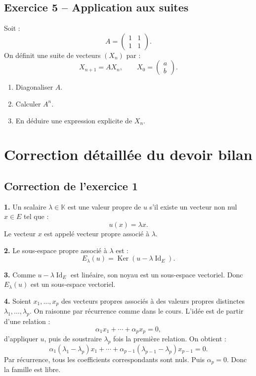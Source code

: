 \documentclass[11pt,a4paper]{article}
\newcommand{\K}{\mathbb K}
\newcommand{\Ker}{\operatorname{Ker}}
\newcommand{\Id}{\operatorname{Id}}
\begin{document}
\subsection*{Exercice 5 -- Application aux suites}

Soit :
\[
A=
\begin{pmatrix}
1&1\\
1&1
\end{pmatrix}.
\]
On définit une suite de vecteurs \((X_n)\) par :
\[
X_{n+1}=AX_n,
\qquad
X_0=
\begin{pmatrix}
a\\b
\end{pmatrix}.
\]

\begin{enumerate}
    \item Diagonaliser \(A\).
    \item Calculer \(A^n\).
    \item En déduire une expression explicite de \(X_n\).
\end{enumerate}

\newpage

\section{Correction détaillée du devoir bilan}

\subsection*{Correction de l'exercice 1}

\textbf{1.}  
Un scalaire \(\lambda\in\K\) est une valeur propre de \(u\) s'il existe un vecteur non nul \(x\in E\) tel que :
\[
u(x)=\lambda x.
\]
Le vecteur \(x\) est appelé vecteur propre associé à \(\lambda\).

\textbf{2.}  
Le sous-espace propre associé à \(\lambda\) est :
\[
E_\lambda(u)=\Ker(u-\lambda\Id_E).
\]

\textbf{3.}  
Comme \(u-\lambda\Id_E\) est linéaire, son noyau est un sous-espace vectoriel.  
Donc \(E_\lambda(u)\) est un sous-espace vectoriel.

\textbf{4.}  
Soient \(x_1,\dots,x_p\) des vecteurs propres associés à des valeurs propres distinctes \(\lambda_1,\dots,\lambda_p\).  
On raisonne par récurrence comme dans le cours.  
L'idée est de partir d'une relation :
\[
\alpha_1x_1+\cdots+\alpha_px_p=0,
\]
d'appliquer \(u\), puis de soustraire \(\lambda_p\) fois la première relation.  
On obtient :
\[
\alpha_1(\lambda_1-\lambda_p)x_1+\cdots+
\alpha_{p-1}(\lambda_{p-1}-\lambda_p)x_{p-1}=0.
\]
Par récurrence, tous les coefficients correspondants sont nuls.  
Puis \(\alpha_p=0\).  
Donc la famille est libre.
\end{document}
